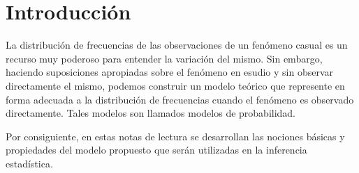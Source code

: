 \section{Introducción}
    La distribución de frecuencias de las observaciones de un fenómeno 
    casual es un recurso muy poderoso para entender la variación del mismo.
    Sin embargo, haciendo suposiciones apropiadas sobre el fenómeno en esudio
    y sin observar directamente el mismo, podemos construir un modelo teórico 
    que represente en forma adecuada a la distribución de frecuencias cuando el fenómeno 
    es observado directamente. Tales modelos son llamados modelos de probabilidad.

    Por consiguiente, en estas notas de lectura se desarrollan las nociones básicas 
    y propiedades del modelo propuesto que serán utilizadas 
    en la inferencia estadística.
